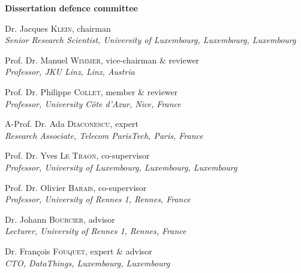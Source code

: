 \documentclass[12pt, twoside]{book}
\begin{document}
\begin{adjustwidth*}{1em}{1em}

\noindent
\textbf{\large Dissertation defence committee}

\vspace{0.2cm}
\noindent
Dr. Jacques \textsc{Klein}, chairman\\
{\small \emph{Senior Research Scientist, University of Luxembourg, Luxembourg, Luxembourg}}

\vspace{0.2cm}
\noindent
Prof. Dr. Manuel \textsc{Wimmer}, vice-chairman \& reviewer\\
{\small \emph{Professor, JKU Linz, Linz, Austria}}

\vspace{0.2cm}
\noindent
Prof. Dr. Philippe \textsc{Collet}, member \& reviewer\\
{\small \emph{Professor, University Côte d'Azur, Nice, France}}

\vspace{0.2cm}
\noindent
A-Prof. Dr. Ada \textsc{Diaconescu}, expert\\
{\small \emph{Research Associate, Telecom ParisTech, Paris, France}}   

\vspace{0.2cm}
\noindent
Prof. Dr. Yves \textsc{Le Traon}, co-supervisor\\
{\small \emph{Professor, University of Luxembourg, Luxembourg, Luxembourg}}

\vspace{0.2cm}
\noindent
Prof. Dr. Olivier \textsc{Barais}, co-supervisor\\
{\small \emph{Professor, University of Rennes 1, Rennes, France}}

\vspace{0.2cm}
\noindent
Dr. Johann \textsc{Bourcier}, advisor\\
{\small \emph{Lecturer, University of Rennes 1, Rennes, France}}   

\vspace{0.2cm}
\noindent
Dr.  Fran\c{c}ois \textsc{Fouquet}, expert \& advisor\\
{\small \emph{CTO, DataThings, Luxembourg, Luxembourg}}   

\end{adjustwidth*}
\end{document}
